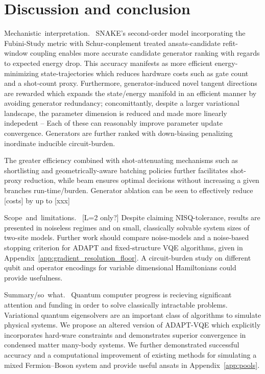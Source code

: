 \documentclass[
  reprint,
  amsmath,
  amssymb,
  aps,
  pra,
  nofootinbib,
  superscriptaddress,
  floatfix
]{revtex4-2}
\newcommand{\placeholder}[1]{\textcolor{red!70!black}{\ifmmode\left[#1\right]\else\textsf{[#1]}\fi}}
\newcommand{\tentative}[1]{\textcolor{red!70!black}{#1}}
\newcommand{\structlabel}[1]{\noindent\mbox{\tentative{#1.}}~}
\begin{document}
\section{Discussion and conclusion}
\label{sec:discussion}
\label{sec:conclusion}

\structlabel{Mechanistic interpretation}
SNAKE's second-order model incorporating the Fubini-Study metric with Schur-conplement treated ansats-candidate refit-window coupling enables more accurate candidate generator ranking with regards to expected energy drop. This accuracy manifests as more efficient energy-minimizing state-trajectories which reduces hardware costs such as gate count and a shot-count proxy. Furthermore, generator-induced novel tangent directions are rewarded which expands the state/energy manifold in an efficient manner by avoiding generator redundancy; concomittantly, despite a larger variational landscape, the parameter dimension is reduced and made more linearly indepedent -- Each of these can reasonably improve parameter update convergence. Generators are further ranked with down-biasing penalizing inordinate inducible circuit-burden.

The greater efficiency combined with shot-attenuating mechanisms such as shortlisting and geometrically-aware batching policies further facilitates shot-proxy reduction, while beam ensures optimal decisions without increasing a given branches run-time/burden. Generator ablation can be seen to effectively reduce \placeholder{costs} by up to \placeholder{xxx}

\structlabel{Scope and limitations}
\placeholder{L=2 only?}
Despite claiming NISQ-tolerance, results are presented in noiseless regimes and on small, classically solvable system sizes of two-site models. Further work should compare noise-models and a noise-based stopping criterion for ADAPT and fixed-structure VQE algorithms, given in Appendix~\ref{app:gradient_resolution_floor}. A circuit-burden study on different qubit and operator encodings for variable dimensional Hamiltonians could provide usefulness.

\structlabel{Summary/so what}
Quantum computer progress is recieving significant attention and funding in order to solve classically intractable problems. Variational quantum eigensolvers are an important class of algorithms to simulate physical systems. We propose an altered version of ADAPT-VQE which explicitly incorporates hard-ware constraints and demonstrates superior convergence in condensed matter many-body systems. We further demonstrated successful accuracy and a computational improvement of existing methods for simulating a mixed Fermion--Boson system and provide useful ansats in Appendix~\ref{app:pools}.
\end{document}
